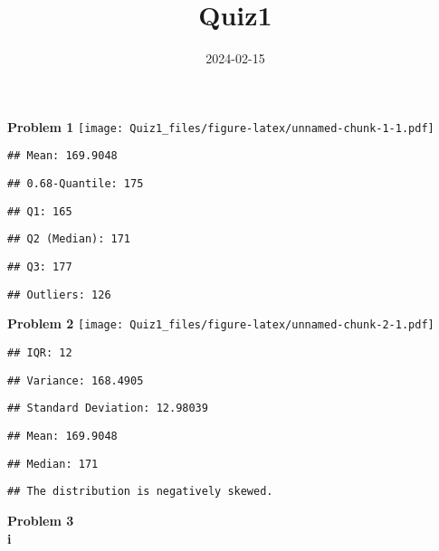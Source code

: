 \documentclass[
]{article}
\title{Quiz1}
\author{}
\date{\vspace{-2.5em}2024-02-15}
\begin{document}
\maketitle

\textbf{Problem 1}
\texttt{[image: Quiz1\_files/figure-latex/unnamed-chunk-1-1.pdf]}

\begin{verbatim}
## Mean: 169.9048
\end{verbatim}

\begin{verbatim}
## 0.68-Quantile: 175
\end{verbatim}

\begin{verbatim}
## Q1: 165
\end{verbatim}

\begin{verbatim}
## Q2 (Median): 171
\end{verbatim}

\begin{verbatim}
## Q3: 177
\end{verbatim}

\begin{verbatim}
## Outliers: 126
\end{verbatim}

\textbf{Problem 2}
\texttt{[image: Quiz1\_files/figure-latex/unnamed-chunk-2-1.pdf]}

\begin{verbatim}
## IQR: 12
\end{verbatim}

\begin{verbatim}
## Variance: 168.4905
\end{verbatim}

\begin{verbatim}
## Standard Deviation: 12.98039
\end{verbatim}

\begin{verbatim}
## Mean: 169.9048
\end{verbatim}

\begin{verbatim}
## Median: 171
\end{verbatim}

\begin{verbatim}
## The distribution is negatively skewed.
\end{verbatim}

\textbf{Problem 3}\\
\textbf{i}
\end{document}
